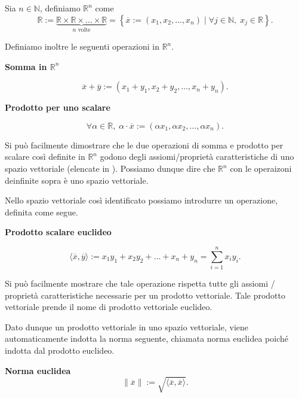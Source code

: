 Sia $n\in\mathbb{N}$, definiamo $\mathbb{R}^n$ come \[\mathbb{R} := \underbrace{\mathbb{R}\times
\mathbb{R}\times \dots \times\mathbb{R}}_{n \text{ volte}} = \left\{\overline{x}:=\left(x_1,
x_2, \ldots , x_n\right)\mid \forall j\in\mathbb{N},\;x_j\in\mathbb{R}\right\}.\]

Definiamo inoltre le seguenti operazioni in $\mathbb{R}^n$.

\begin{definition}
    \textbf{Somma in $\mathbb{R}^n$}
    
    \[
        \overline{x} + \overline{y} := \left(x_1+y_1, x_2+y_2, \ldots, x_n+y_n\right).
    \]
\end{definition}
\begin{definition}
    \textbf{Prodotto per uno scalare}
    
    \[
        \forall \alpha\in\mathbb{R},\; \alpha\cdot\overline{x} :=\left(\alpha x_1,
        \alpha x_2, \ldots, \alpha x_n\right).
    \]
\end{definition}

Si può facilmente dimostrare che le due operazioni di somma e prodotto per scalare così
definite in $\mathbb{R}^n$ godono degli assiomi/proprietà caratteristiche di uno spazio
vettoriale (elencate in ).
Possiamo dunque dire che $\mathbb{R}^n$ con le operaizoni deinfinite sopra è uno spazio vettoriale.

Nello spazio vettoriale così identificato possiamo introdurre un operazione, definita
come segue.

\begin{definition}
    \textbf{Prodotto scalare euclideo}
    
    \[
        \langle \overline{x}, \overline{y}\rangle := x_1 y_1 + x_2 y_2 + \ldots + x_n+y_n
         = \sum_{i = 1}^{n} x_i y_i.
    \]
\end{definition}

Si può facilmente mostrare che tale operazione rispetta tutte gli assiomi / proprietà
caratteristiche necessarie per un prodotto vettoriale.
Tale prodotto vettoriale prende il nome di prodotto vettoriale euclideo.

Dato dunque un prodotto vettoriale in uno spazio vettoriale, viene automaticamente indotta
la norma seguente, chiamata norma euclidea poiché indotta dal prodotto euclideo.



\begin{definition}
    \textbf{Norma euclidea}
    \[
        \| \overline{x} \| := \sqrt{\langle \overline{x}, \overline{x} \rangle}.
    \]
\end{definition}


